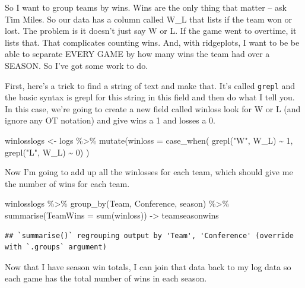 \documentclass[
]{book}
\newenvironment{Shaded}{\begin{snugshade}}{\end{snugshade}}
\newcommand{\AttributeTok}[1]{\textcolor[rgb]{0.77,0.63,0.00}{#1}}
\newcommand{\DecValTok}[1]{\textcolor[rgb]{0.00,0.00,0.81}{#1}}
\newcommand{\FunctionTok}[1]{\textcolor[rgb]{0.00,0.00,0.00}{#1}}
\newcommand{\NormalTok}[1]{#1}
\newcommand{\OtherTok}[1]{\textcolor[rgb]{0.56,0.35,0.01}{#1}}
\newcommand{\SpecialCharTok}[1]{\textcolor[rgb]{0.00,0.00,0.00}{#1}}
\newcommand{\StringTok}[1]{\textcolor[rgb]{0.31,0.60,0.02}{#1}}
\begin{document}
So I want to group teams by wins. Wins are the only thing that matter -- ask Tim Miles. So our data has a column called W\_L that lists if the team won or lost. The problem is it doesn't just say W or L. If the game went to overtime, it lists that. That complicates counting wins. And, with ridgeplots, I want to be be able to separate EVERY GAME by how many wins the team had over a SEASON. So I've got some work to do.

First, here's a trick to find a string of text and make that. It's called \texttt{grepl} and the basic syntax is grepl for this string in this field and then do what I tell you. In this case, we're going to create a new field called winloss look for W or L (and ignore any OT notation) and give wins a 1 and losses a 0.

\begin{Shaded}
\begin{Highlighting}[]
\NormalTok{winlosslogs }\OtherTok{\textless{}{-}}\NormalTok{ logs }\SpecialCharTok{\%\textgreater{}\%} \FunctionTok{mutate}\NormalTok{(}\AttributeTok{winloss =} \FunctionTok{case\_when}\NormalTok{(}
  \FunctionTok{grepl}\NormalTok{(}\StringTok{"W"}\NormalTok{, W\_L) }\SpecialCharTok{\textasciitilde{}} \DecValTok{1}\NormalTok{, }
  \FunctionTok{grepl}\NormalTok{(}\StringTok{"L"}\NormalTok{, W\_L) }\SpecialCharTok{\textasciitilde{}} \DecValTok{0}\NormalTok{)}
\NormalTok{)}
\end{Highlighting}
\end{Shaded}

Now I'm going to add up all the winlosses for each team, which should give me the number of wins for each team.

\begin{Shaded}
\begin{Highlighting}[]
\NormalTok{winlosslogs }\SpecialCharTok{\%\textgreater{}\%} \FunctionTok{group\_by}\NormalTok{(Team, Conference, season) }\SpecialCharTok{\%\textgreater{}\%} \FunctionTok{summarise}\NormalTok{(}\AttributeTok{TeamWins =} \FunctionTok{sum}\NormalTok{(winloss)) }\OtherTok{{-}\textgreater{}}\NormalTok{ teamseasonwins}
\end{Highlighting}
\end{Shaded}

\begin{verbatim}
## `summarise()` regrouping output by 'Team', 'Conference' (override with `.groups` argument)
\end{verbatim}

Now that I have season win totals, I can join that data back to my log data so each game has the total number of wins in each season.
\end{document}
